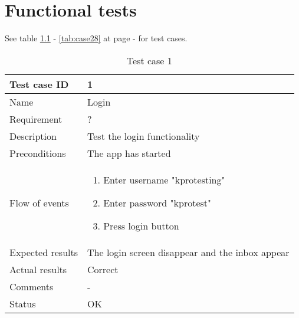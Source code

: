 \chapter{Functional tests}\label{ch:funtest}
		See table \ref{tab:case1} - \ref{tab:case28} at page \pageref{tab:case1} - \pageref{tab:case28} for test cases.
		\begin{table}[h!]
			\begin{tabular}{l|p{10cm}}
				Test case ID & 1 \\ \hline
				Name & Login\\ \hline
				Requirement & ? \\ \hline
				Description & Test the login functionality\\ \hline
				Preconditions & The app has started\\ \hline
				Flow of events & 
					\begin{enumerate}
						\item{}Enter username "kprotesting"
						\item{}Enter password "kprotest"
						\item{}Press login button
					\end{enumerate} \\ \hline
				Expected results & The login screen disappear and the inbox appear\\ \hline
				Actual results & Correct\\ \hline
				Comments & -\\ \hline
				Status & OK\\ \hline
			\end{tabular}
			\caption{Test case 1} \label{tab:case1}
		\end{table}

